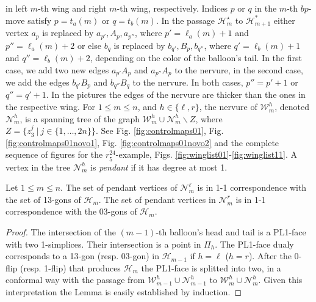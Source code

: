 in left $m$-th wing and right $m$-th wing, respectively.
Indices $p$ or $q$ in the $m$-th $bp$-move satisfy $p=t_a(m)$ or $q=t_b(m)$.
In the passage $\mathcal{H}_m^\star$ to $\mathcal{H}_{m+1}^\ast$ either 
vertex $a_p$ is replaced by $a_{p'},A_p,a_{p''}$, where $p'=\ell_a(m)+1$ and 
$p'' =\ell_a(m)+2$ or else
$b_q$ is replaced by $b_{q'},B_p,b_{q''}$, where $q'=\ell_b(m)+1$ and $q''=\ell_b(m)+2$,
depending on the color of the balloon's tail. In the first case, we add two new edges
$a_{p'}A_p$ and $a_{p''}A_p$ to the nervure, in the second case, we add the edges
$b_{q'}B_p$ and $b_{q''}B_q$ to the nervure. In both cases, $p''=p'+1$ or
$q''=q'+1$. In the pictures the edges of the nervure
are thicker than the ones in the respective wing.
For $1\le m\le n$, and $h\in \{\ell,r\}$, the nervure of $\mathcal{W}^h_m$, 
denoted $\mathcal{N}^h_m$, is a spanning tree of the graph 
$\mathcal{W}^h_m \cup \mathcal{N}^h_m \backslash Z$, where $Z= \{z_3^j~|~ j\in \{1, \ldots, 2n\}\}.$
See Fig. \ref{fig:controlmaps01}, Fig. \ref{fig:controlmaps01novo1},  
Fig. \ref{fig:controlmaps01novo2}
and the complete sequence of figures for the $r^{24}_5$-example, 
Figs. \ref{fig:winglist01}-\ref{fig:winglist11}. 
A vertex in the tree $\mathcal{N}^h_m$ is {\em pendant} if it has degree at most 1.



\begin{lemma}
 Let $1\le m \le n$. The set of pendant vertices of $\mathcal{N}_m^\ell$ is
in 1-1 correspondence with the set of 13-gons of $\mathcal{H}_m$. 
 The set of pendant vertices in $\mathcal{N}_m^r$ is
in 1-1 correspondence with the 03-gons of $\mathcal{H}_m$.
\label{lem:internalpointsbigons}
\end{lemma}
\begin{proof}
The intersection of the $(m-1)$-th balloon's head and tail is a 
PL1-face with two 1-simplices. Their intersection is a point in $\Pi_h$.
The PL1-face dualy corresponds to a 13-gon (resp. 03-gon) in $\mathcal{H}_{m-1}$
if $h=\ell$ ($h=r$). After the 0-flip (resp. 1-flip) that produces  $\mathcal{H}_m$
the PL1-face is splitted into two, in a conformal way with the passage 
from  $\mathcal{W}^h_{m-1} \cup \mathcal{N}^h_{m-1}$ to  
$\mathcal{W}^h_m \cup \mathcal{N}^h_m$. Given this interpretation
the Lemma is easily established by induction.
\end{proof}


